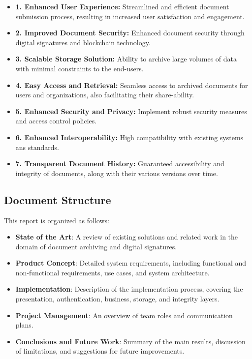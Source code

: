 \documentclass[a4paper,11pt]{article}
\begin{document}
            \begin{itemize}
             \item \textbf{1. Enhanced User Experience:} Streamlined and efficient document submission process, resulting in increased user satisfaction and engagement. 
            
             \item \textbf{2. Improved Document Security:} Enhanced document security through digital signatures and blockchain technology.
    
             \item \textbf{3. Scalable Storage Solution:}  Ability to archive large volumes of data with minimal constraints to the end-users.
    
             \item \textbf{4. Easy Access and Retrieval:} Seamless access to archived documents for users and organizations, also facilitating their share-ability.
    
             \item \textbf{5. Enhanced Security and Privacy:} Implement robust security measures and access control policies.
    
             \item \textbf{6. Enhanced Interoperability:} High compatibility with existing systems ans standards.

             \item \textbf{7. Transparent Document History:} Guaranteed accessibility and integrity of documents, along with their various versions over time.
            \end{itemize}
    
        \subsection{Document Structure}
        This report is organized as follows:
        \begin{itemize}
            \item \textbf{State of the Art}: A review of existing solutions and related work in the domain of document archiving and digital signatures.
            \item \textbf{Product Concept}: Detailed system requirements, including functional and non-functional requirements, use cases, and system architecture.
            \item \textbf{Implementation}: Description of the implementation process, covering the presentation, authentication, business, storage, and integrity layers.
            \item \textbf{Project Management}: An overview of team roles and communication plans.
            \item \textbf{Conclusions and Future Work}: Summary of the main results, discussion of limitations, and suggestions for future improvements.
        \end{itemize}
    
\end{document}
